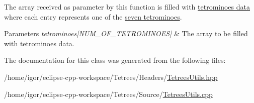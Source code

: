 The array received as parameter by this function is filled with \hyperlink{structpiece__t}{tetrominoes\textquotesingle{} data} where each entry represents one of the \hyperlink{TetreesDefs_8hpp_acd279a62a49ecee418dd808ac39a1795}{seven tetrominoes}. 
\begin{DoxyParams}{Parameters}
{\em tetrominoes\mbox{[}\+N\+U\+M\+\_\+\+O\+F\+\_\+\+T\+E\+T\+R\+O\+M\+I\+N\+O\+E\+S\mbox{]}} & The array to be filled with tetrominoes\textquotesingle{} data. \\
\hline
\end{DoxyParams}


The documentation for this class was generated from the following files\+:\begin{DoxyCompactItemize}
\item 
/home/igor/eclipse-\/cpp-\/workspace/\+Tetrees/\+Headers/\hyperlink{TetreesUtils_8hpp}{Tetrees\+Utils.\+hpp}\item 
/home/igor/eclipse-\/cpp-\/workspace/\+Tetrees/\+Source/\hyperlink{TetreesUtils_8cpp}{Tetrees\+Utils.\+cpp}\end{DoxyCompactItemize}
